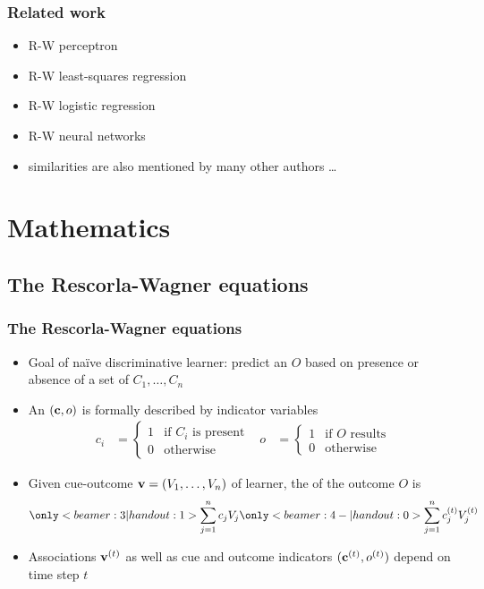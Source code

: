 \documentclass[t]{beamer} %
\begin{document}
\begin{frame}
  \frametitle{Related work}

  \begin{itemize}
  \item R-W \vs perceptron \citep[p.~155f]{Sutton:Barto:81}
  \item R-W \vs least-squares regression \citep[p.~457]{Stone:86}
  \item R-W \vs logistic regression \citep[p.~234]{Gluck:Bower:88}
  \item R-W \vs neural networks \citep{Dawson:08}
  \item[\hand] similarities are also mentioned by many other authors \ldots
  \end{itemize}
\end{frame}

\section{Mathematics}

\subsection{The Rescorla-Wagner equations}

\begin{frame}
  \frametitle{The Rescorla-Wagner equations}

  \begin{itemize}
  \item<1-> Goal of naïve discriminative learner: predict an  $O$ based on presence or absence of a set of  $C_1, \ldots, C_n$
  \item<2-> An  $(\vc, o)$ is formally described by indicator variables
    \begin{align*}
      c_i &= 
       \begin{cases}
         1 & \text{if $C_i$ is present} \\
         0 & \text{otherwise}
       \end{cases}
      &
      o &= 
       \begin{cases}
         1 & \text{if $O$ results} \\
         0 & \text{otherwise}
       \end{cases}
    \end{align*}
  \item<3-> Given cue-outcome  $\vv = (V_1, \ldots, V_n)$ of learner, the  of the outcome $O$ is
    \[
    \only<beamer:3| handout:1>{
      \sum_{j=1}^n c_j V_j}
    \only<beamer:4-| handout:0>{
      \sum_{j=1}^n c_j\psupt V_j\psupt}
    \]
  \item<4-> Associations $\vv[t]$ as well as cue and outcome indicators $(\vc[t], o\psupt)$ depend on time step $t$
  \end{itemize}
\end{frame}
\end{document}
